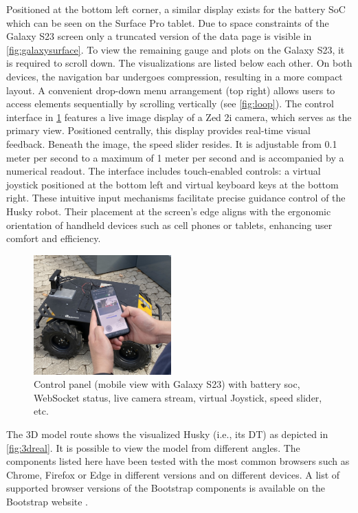 \documentclass[conference]{IEEEtran}
\begin{document}
Positioned at the bottom left corner, a similar display exists for the battery SoC which can be seen on the Surface Pro tablet. Due to space constraints of the Galaxy S23 screen only a truncated version of the data page is visible in \cref{fig:galaxysurface}. To view the remaining gauge and plots on the Galaxy S23, it is required to scroll down. The visualizations are listed below each other.  
On both devices, the navigation bar undergoes compression, resulting in a more compact layout.
A convenient drop-down menu arrangement (top right) allows users to access elements sequentially by scrolling vertically (see \cref{fig:loop}).
The control interface in \cref{fig:galaxycontrol} features a live image display of a Zed 2i camera, which serves as the primary view. Positioned centrally, this display provides real-time visual feedback. Beneath the image, the speed slider resides. It is adjustable from 0.1 meter per second to a maximum of 1 meter per second and is accompanied by a numerical readout.
The interface includes touch-enabled controls: a virtual joystick positioned at the bottom left and virtual keyboard keys at the bottom right. These intuitive input mechanisms facilitate precise guidance control of the Husky robot. 
Their placement at the screen's edge aligns with the ergonomic orientation of handheld devices such as cell phones or tablets, enhancing user comfort and efficiency. 
\begin{figure}[b]
    \centerline{\includegraphics[width=5.3cm]{Pictures/galaxycontrol.jpg}}
    \caption{Control panel (mobile view with Galaxy S23) with battery soc, WebSocket status, live camera stream, virtual Joystick, speed slider, etc.}
    \label{fig:galaxycontrol}
\end{figure}
The 3D model route shows the visualized Husky (i.e., its  DT) as depicted in \cref{fig:3dreal}. It is possible to view the model from different angles.
The components listed here have been tested with the most common browsers such as Chrome, Firefox or Edge in different versions and on different devices. A list of supported browser versions of the Bootstrap components is available on the Bootstrap website \cite{bsBrowsers}. 
\end{document}
